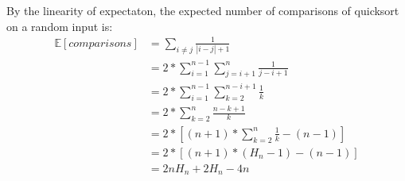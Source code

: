 By the linearity of expectaton, the expected number of comparisons of quicksort on a random input is:\\
\begin{align}
	\mathbb{E}[comparisons] &= \sum_{i \neq j} \frac{1}{|i - j| + 1}\\
							&= 2 * \sum_{i = 1}^{n - 1} \sum_{j = i + 1}^{n} \frac{1}{j - i + 1}\\
							&= 2 * \sum_{i = 1}^{n - 1} \sum_{k = 2}^{n - i + 1} \frac{1}{k}\\
							&= 2 * \sum_{k = 2}^{n} \frac{n - k + 1}{k}\\
							&= 2 * [(n + 1) * \sum_{k = 2}^{n} \frac{1}{k} - (n - 1)]\\
							&= 2 * [(n + 1) * (H_n - 1) - (n - 1)]\\
							&= 2nH_n + 2H_n - 4n
\end{align}